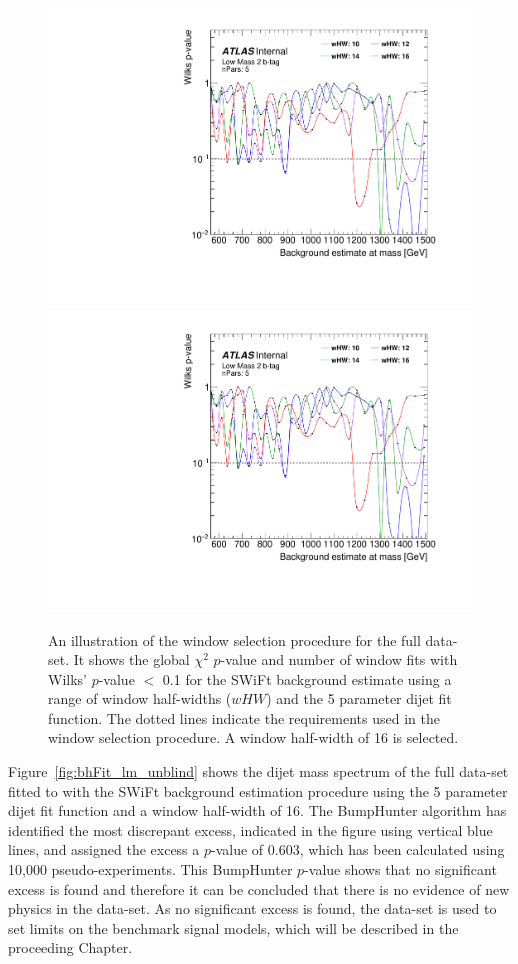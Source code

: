 \vspace{-2mm}
\begin{figure}[!htb]
\captionsetup[subfigure]{aboveskip=0pt,justification=centering}
\centering
{} {
  \includegraphics[width=0.45\linewidth, angle=0,page=6]{figs/Dibjet/LowMass/FitStudy_min566/windowSel_unblind.pdf}
}\hspace{-5mm}
 {
  \includegraphics[width=0.45\linewidth, angle=0,page=8]{figs/Dibjet/LowMass/FitStudy_min566/windowSel_unblind.pdf}
}
\vspace{2pt}
\caption{\label{fig:windowSel_unblind}
  An illustration of the window selection procedure for the full \lm{} data-set.
  It shows the global $\chi^{2}$ \mbox{$p$-value} and number of window fits with Wilks' \mbox{$p$-value} $<$ 0.1
  for the SWiFt background estimate using a range of window half-widths ($wHW$) and the 5 parameter dijet fit function.
  The dotted lines indicate the requirements used in the window selection procedure. A window half-width of 16 is selected.
}
\end{figure}
\vspace{-3mm}

Figure~\ref{fig:bhFit_lm_unblind} shows the dijet mass spectrum of the full \lm{} data-set
fitted to with the SWiFt background estimation procedure using the 5 parameter dijet fit function and a window half-width of 16.
The BumpHunter algorithm has identified the most discrepant excess, indicated in the figure using vertical blue lines,
and assigned the excess a \mbox{$p$-value} of 0.603, which has been calculated using 10,000 pseudo-experiments.
This BumpHunter $p$-value shows that no significant excess is found 
and therefore it can be concluded that there is no evidence of new physics in the \lm{} data-set.
As no significant excess is found, the \lm{} data-set is used to set limits on the benchmark signal models,
which will be described in the proceeding Chapter.


